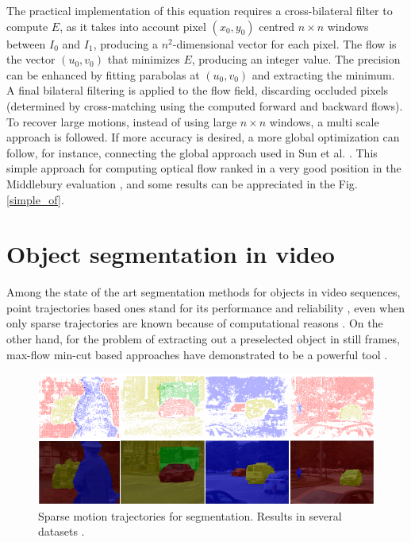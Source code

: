 The practical implementation of this equation requires a cross-bilateral filter to compute $E$, as it takes into account 
pixel $(x_0,y_0)$ centred $n \times n$ windows between $I_0$ and $I_1$, producing a $n^2$-dimensional vector for each pixel. 
The flow is the vector $(u_0, v_0)$ that minimizes $E$, producing an integer value. The precision can be enhanced by fitting 
parabolas at  $(u_0, v_0)$ and extracting the minimum. A final bilateral filtering is applied to the flow field, discarding 
occluded pixels (determined by cross-matching using the computed forward and backward flows). 
To recover large motions, instead of using large $n \times n$ windows, a multi scale approach is followed. 
If more accuracy is desired, a more global optimization can follow, for instance, connecting the global approach used in Sun et al. \cite{c40}.
This simple approach for computing optical flow ranked in a very good position in the Middlebury evaluation \cite{c17}, 
and some results can be appreciated in the Fig. \ref{simple_of}.

\section{Object segmentation in video}

Among the state of the art segmentation methods for objects in video
sequences, point trajectories based ones stand for its performance and 
reliability \cite{c33}, even when only sparse trajectories are known because of
computational reasons \cite{c34}. On the other hand, for the problem of extracting out a 
preselected object in still frames, max-flow min-cut based approaches 
have demonstrated to be a powerful tool \cite{c14}\cite{c18}. 

   \begin{figure}[thpb]
      \centering
      \includegraphics[height=0.28\textheight]{../images/point_traj_segm.png}
      \caption{  Sparse motion trajectories for segmentation. Results in several datasets  \cite{c34}. }
      \label{pt_segment}
   \end{figure}

